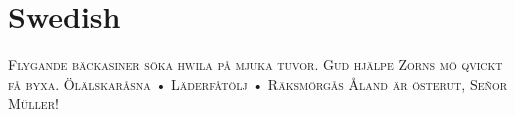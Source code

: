 

\presection\section*{\checkyes Swedish}\postsection

\textsc{
Flygande bäckasiner söka hwila på mjuka tuvor. 
Gud hjälpe Zorns mö qvickt få byxa.
Ölälskaråsna • Läderfåtölj • Räksmörgås
Åland är österut, Señor Müller!
}